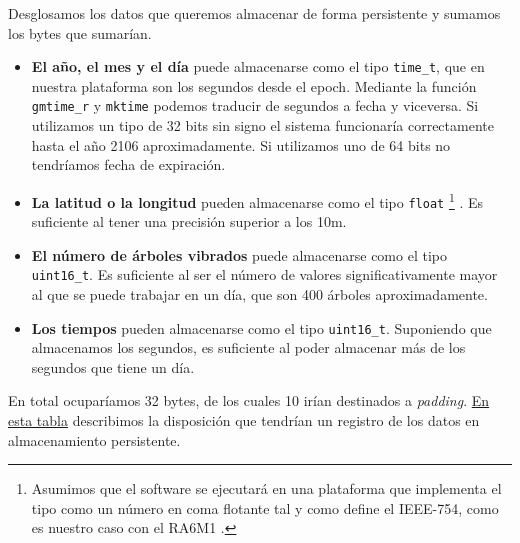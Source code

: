Desglosamos los datos que queremos almacenar de forma persistente y sumamos los bytes que sumarían.

\begin{itemize}[noitemsep,nolistsep]
    \item \textbf{El año, el mes y el día} puede almacenarse como el tipo \texttt{time\_t}, que en nuestra
        plataforma son los segundos desde el epoch.
        Mediante la función \texttt{gmtime\_r} y \texttt{mktime} podemos traducir de
        segundos a fecha y viceversa. Si utilizamos un tipo de 32 bits sin signo el sistema funcionaría
        correctamente hasta el año 2106 aproximadamente. Si utilizamos uno de 64 bits no tendríamos fecha
        de expiración.
    \item \textbf{La latitud o la longitud} pueden almacenarse como el tipo \texttt{float}%
    \footnote{Asumimos que el software se ejecutará en una plataforma que implementa el tipo como
    un número en coma flotante tal y como define el IEEE-754, como es nuestro caso con el RA6M1 \cite{renesas:RA6M1}.}%
    . Es suficiente al tener una precisión superior a los 10m.
    \item \textbf{El número de árboles vibrados} puede almacenarse como el tipo \texttt{uint16\_t}. Es
        suficiente al ser el número de valores significativamente mayor al que se puede trabajar en un
        día, que son 400 árboles aproximadamente.
    \item \textbf{Los tiempos} pueden almacenarse como el tipo \texttt{uint16\_t}. Suponiendo que almacenamos
        los segundos, es suficiente al poder almacenar más de los segundos que tiene un día.
\end{itemize}

En total ocuparíamos 32 bytes, de los cuales 10 irían destinados a \textit{padding}.
\hyperref[table:almacenamiento]{En esta tabla} describimos la disposición que tendrían un registro
de los datos en almacenamiento persistente.

